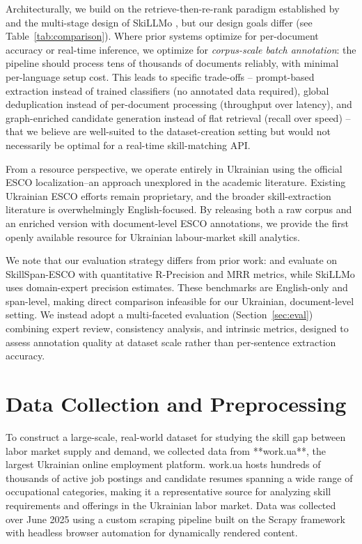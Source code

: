 \documentclass[11pt]{article}
\begin{document}
Architecturally, we build on the retrieve-then-re-rank paradigm established by \citet{Clavi2023} and the multi-stage design of SkiLLMo \citep{Malandri2025}, but our design goals differ (see Table~\ref{tab:comparison}). Where prior systems optimize for per-document accuracy or real-time inference, we optimize for \emph{corpus-scale batch annotation}: the pipeline should process tens of thousands of documents reliably, with minimal per-language setup cost. This leads to specific trade-offs -- prompt-based extraction instead of trained classifiers (no annotated data required), global deduplication instead of per-document processing (throughput over latency), and graph-enriched candidate generation instead of flat retrieval (recall over speed) -- that we believe are well-suited to the dataset-creation setting but would not necessarily be optimal for a real-time skill-matching API.

From a resource perspective, we operate entirely in Ukrainian using the official ESCO localization--an approach unexplored in the academic literature. Existing Ukrainian ESCO efforts remain proprietary, and the broader skill-extraction literature is overwhelmingly English-focused. By releasing both a raw corpus and an enriched version with document-level ESCO annotations, we provide the first openly available resource for Ukrainian labour-market skill analytics.

We note that our evaluation strategy differs from prior work: \citet{Clavi2023} and \citet{Decorte2025} evaluate on SkillSpan-ESCO with quantitative R-Precision and MRR metrics, while SkiLLMo uses domain-expert precision estimates. These benchmarks are English-only and span-level, making direct comparison infeasible for our Ukrainian, document-level setting. We instead adopt a multi-faceted evaluation (Section~\ref{sec:eval}) combining expert review, consistency analysis, and intrinsic metrics, designed to assess annotation quality at dataset scale rather than per-sentence extraction accuracy.

\section{Data Collection and Preprocessing}

To construct a large-scale, real-world dataset for studying the skill gap between labor market supply and demand, we collected data from **work.ua**, the largest Ukrainian online employment platform. work.ua hosts hundreds of thousands of active job postings and candidate resumes spanning a wide range of occupational categories, making it a representative source for analyzing skill requirements and offerings in the Ukrainian labor market. Data was collected over  June 2025 using a custom scraping pipeline built on the Scrapy framework with headless browser automation for dynamically rendered content.
\end{document}
